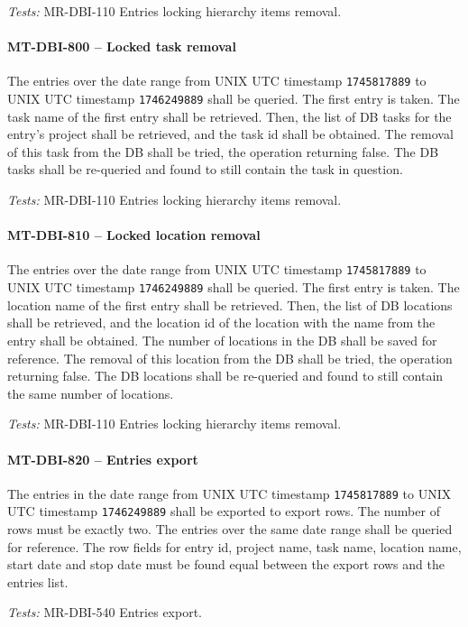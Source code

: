 \textit{Tests: } MR-DBI-110 Entries locking hierarchy items removal.

\paragraph{MT-DBI-800 -- Locked task removal}
The entries over the date range from UNIX UTC timestamp
\lstinline{1745817889} to UNIX UTC timestamp \lstinline{1746249889}
shall be queried. The first entry is taken.
The task name of the first entry shall be retrieved.
Then, the list of DB tasks for the entry's project shall be retrieved, and the
task id shall be obtained.
The removal of this task from the DB shall be tried, the operation
returning false. The DB tasks shall be re-queried and found to still
contain the task in question.

\textit{Tests: } MR-DBI-110 Entries locking hierarchy items removal.

\paragraph{MT-DBI-810 -- Locked location removal}
The entries over the date range from UNIX UTC timestamp
\lstinline{1745817889} to UNIX UTC timestamp \lstinline{1746249889}
shall be queried. The first entry is taken.
The location name of the first entry shall be retrieved.
Then, the list of DB locations shall be retrieved, and the location
id of the location with the name from the entry shall be obtained.
The number of locations in the DB shall be saved for reference.
The removal of this location from the DB shall be tried, the operation
returning false. The DB locations shall be re-queried and found to still
contain the same number of locations.

\textit{Tests: } MR-DBI-110 Entries locking hierarchy items removal.

\paragraph{MT-DBI-820 -- Entries export}
The entries in the date range from UNIX UTC timestamp \lstinline{1745817889} to
UNIX UTC timestamp \lstinline{1746249889} shall be exported to export rows. The
number of rows must be exactly two.
The entries over the same date range shall be queried for reference. The row
fields for entry id, project name, task name, location name, start date and stop
date must be found equal between the export rows and the entries list.

\textit{Tests: } MR-DBI-540 Entries export.

